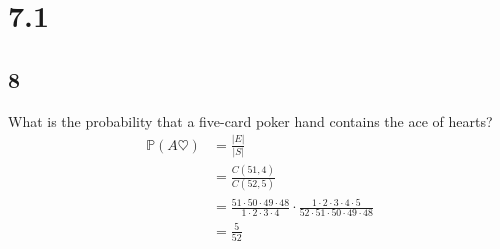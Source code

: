 \documentclass{article}
\begin{document}
\newcommand{\hr}{\par\noindent\rule{\textwidth}{0.4pt}}

\newcommand{\bc}[1]{
	\begin{equation*}
		\begin{boxed}
			{#1}
		\end{boxed}
	\end{equation*}
}

\newcommand{\cond}[2]{
	\ifmmode
	{#1} \quad {#2}
	\else
	$$ {#1} \quad {#2} $$
	\fi
}

\newcommand{\matr}[1]{
	\ifmmode \bm{#1}
	\else \textit{\textbf{#1}}
	\fi
}
\newcommand{\vect}[1]{
	\ifmmode \mathbf{#1}
	\else \textbf{#1}
	\fi
}


\tableofcontents

\section{7.1}

\subsection{8}

What is the probability that a five-card poker hand contains the ace of hearts?
\begin{align*}
	\mathbb{P}(A \heartsuit) & = \frac{ |E| }{ |S| }                                                                                                                                            \\
	                         & = \frac{ C(51, 4) }{ C(52, 5) }                                                                                                                                  \\
	                         & = \frac{ 51 \cdot 50 \cdot 49 \cdot 48 }{ 1 \cdot 2 \cdot 3 \cdot 4 } \cdot \frac{ 1 \cdot 2 \cdot 3 \cdot 4 \cdot 5 }{ 52 \cdot 51 \cdot 50 \cdot 49 \cdot 48 } \\
	                         & = \frac{ 5 }{ 52 }
\end{align*}
\end{document}
